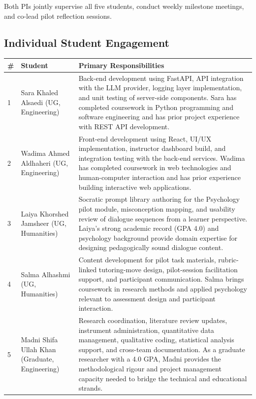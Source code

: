 \documentclass[11pt,a4paper]{article}
\begin{document}
Both PIs jointly supervise all five students, conduct weekly milestone meetings, and co-lead pilot reflection sessions.

\subsection*{Individual Student Engagement}

\begin{tabularx}{\textwidth}{|l|l|X|}
\hline
\rowcolor{lightGray}
\textbf{\#} & \textbf{Student} & \textbf{Primary Responsibilities} \\ \hline
1 & Sara Khaled Alsaedi (UG, Engineering) & Back-end development using FastAPI, API integration with the LLM provider, logging layer implementation, and unit testing of server-side components. Sara has completed coursework in Python programming and software engineering and has prior project experience with REST API development. \\ \hline
2 & Wadima Ahmed Aldhaheri (UG, Engineering) & Front-end development using React, UI/UX implementation, instructor dashboard build, and integration testing with the back-end services. Wadima has completed coursework in web technologies and human-computer interaction and has prior experience building interactive web applications. \\ \hline
3 & Laiya Khorshed Jamsheer (UG, Humanities) & Socratic prompt library authoring for the Psychology pilot module, misconception mapping, and usability review of dialogue sequences from a learner perspective. Laiya's strong academic record (GPA 4.0) and psychology background provide domain expertise for designing pedagogically sound dialogue content. \\ \hline
4 & Salma Alhashmi (UG, Humanities) & Content development for pilot task materials, rubric-linked tutoring-move design, pilot-session facilitation support, and participant communication. Salma brings coursework in research methods and applied psychology relevant to assessment design and participant interaction. \\ \hline
5 & Madni Shifa Ullah Khan (Graduate, Engineering) & Research coordination, literature review updates, instrument administration, quantitative data management, qualitative coding, statistical analysis support, and cross-team documentation. As a graduate researcher with a 4.0 GPA, Madni provides the methodological rigour and project management capacity needed to bridge the technical and educational strands. \\ \hline
\end{tabularx}
\end{document}
